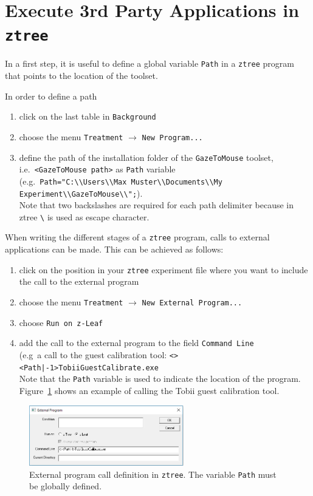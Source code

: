\documentclass[a4paper,oneside]{book}
\begin{document}
\section{Execute 3rd Party Applications in \texttt{ztree}}
\label{sec.external}
In a first step, it is useful to define a global variable \texttt{Path} in a \texttt{ztree} program that points to the location of the toolset.

In order to define a path
\begin{enumerate}
    \item click on the last table in \texttt{Background}
    \item choose the menu \texttt{Treatment} $\rightarrow$ \texttt{New Program...}
    \item define the path of the installation folder of the \texttt{GazeToMouse} toolset, i.e.~\texttt{<GazeToMouse path>} as \texttt{Path} variable\\
        (e.g.~\texttt{Path="C:\textbackslash\textbackslash Users\textbackslash\textbackslash Max Muster\textbackslash\textbackslash Documents\textbackslash\textbackslash My Experiment\textbackslash\textbackslash GazeToMouse\textbackslash\textbackslash";}). \\
        Note that two backslashes are required for each path delimiter because in ztree \texttt{\textbackslash} is used as escape character.
\end{enumerate}

When writing the different stages of a \texttt{ztree} program, calls to external applications can be made.
This can be achieved as follows:
\begin{enumerate}
    \item click on the position in your \texttt{ztree} experiment file where you want to include the call to the external program
    \item choose the menu \texttt{Treatment} $\rightarrow$ \texttt{New External Program...}
    \item choose \texttt{Run on z-Leaf}
    \item add the call to the external program to the field \texttt{Command Line} \\
        (e.g~a call to the guest calibration tool: \texttt{<><Path|-1>TobiiGuestCalibrate.exe}\\
        Note that the \texttt{Path} variable is used to indicate the location of the program.
        Figure~\ref{fig.extcall} shows an example of calling the Tobii guest calibration tool.
\end{enumerate}
\begin{figure}[ht]
    \centering
    \includegraphics[width=0.6\textwidth]{ztree_extcall.png}
    \caption{External program call definition in \texttt{ztree}. The variable \texttt{Path} must be globally defined.}
    \label{fig.extcall}
\end{figure}
\end{document}
